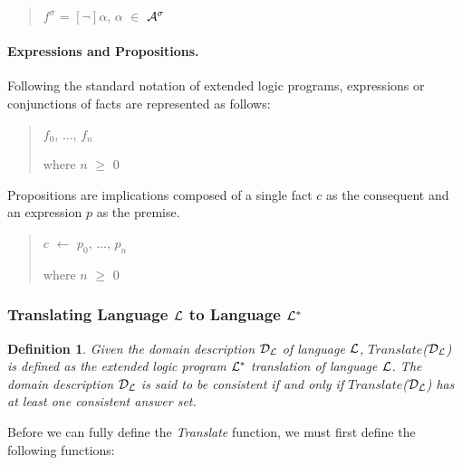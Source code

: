 \documentclass[10pt, twocolumn]{article}
\newtheorem{definition}{Definition}
\begin{document}
          \begin{quote}
            $f^{\sigma}$ = $[\lnot]$$\alpha$, $\alpha$ $\in$ ${\cal A}^{\sigma}$
          \end{quote}

        \paragraph{Expressions and Propositions.}

          Following the standard notation of extended logic programs,
          expressions or conjunctions of facts are represented as follows:

          \begin{quote}
            $f_{0}$, ..., $f_{n}$

            where $n$ $\geq$ $0$
          \end{quote}

          Propositions are implications composed of a single fact $c$ as the
          consequent and an expression $p$ as the premise.

          \begin{quote}
            $c$ $\leftarrow$ $p_{0}$, ..., $p_{n}$

            where $n$ $\geq$ $0$
          \end{quote}

      \subsubsection{Translating Language ${\cal L}$ to Language ${\cal L^{*}}$}

        \begin{definition}
          Given the domain description ${\cal D}_{\cal L}$ of language
          ${\cal L}$, $Translate$(${\cal D}_{\cal L}$) is defined as the
          extended logic program ${\cal L}^{*}$ translation of language
          ${\cal L}$. The domain description ${\cal D}_{\cal L}$ is said to be
          {\em consistent} if and only if $Translate$(${\cal D}_{\cal L}$) has
          at least one consistent answer set. 
        \end{definition}

        Before we can fully define the \emph{Translate} function, we must first
        define the following functions:

        \paragraph{}
\end{document}

